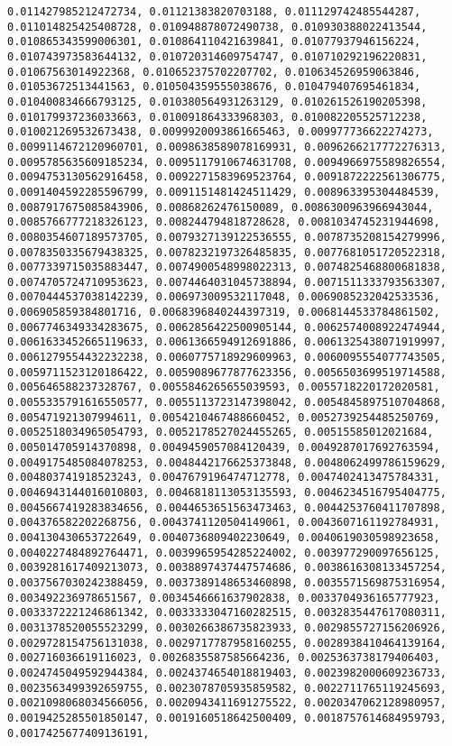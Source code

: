 \documentclass[11pt]{article}
\begin{document}
\begin{Verbatim}[commandchars=\\\{\}]
0.011427985212472734, 0.01121383820703188, 0.011129742485544287, 0.011014825425408728, 0.010948878072490738, 0.010930388022413544, 0.010865343599006301, 0.010864110421639841, 0.01077937946156224, 0.010743973583644132, 0.010720314609754747, 0.010710292196220831, 0.01067563014922368, 0.010652375702207702, 0.010634526959063846, 0.01053672513441563, 0.010504359555038676, 0.010479407695461834, 0.010400834666793125, 0.010380564931263129, 0.010261526190205398, 0.010179937236033663, 0.010091864333968303, 0.010082205525712238, 0.010021269532673438, 0.0099920093861665463, 0.009977736622274273, 0.0099114672120960701, 0.0098638589078169931, 0.0096266217772276313, 0.0095785635609185234, 0.0095117910674631708, 0.0094966975589826554, 0.0094753130562916458, 0.0092271583969523764, 0.0091872222561306775, 0.0091404592285596799, 0.0091151481424511429, 0.008963395304484539, 0.0087917675085843906, 0.00868262476150089, 0.0086300963966943044, 0.0085766777218326123, 0.008244794818728628, 0.0081034745231944698, 0.0080354607189573705, 0.0079327139122536555, 0.0078735208154279996, 0.0078350335679438325, 0.0078232197326485835, 0.0077681051720522318, 0.0077339715035883447, 0.0074900548998022313, 0.0074825468800681838, 0.0074705724710953623, 0.0074464031045738894, 0.0071511333793563307, 0.0070444537038142239, 0.006973009532117048, 0.0069085232042533536, 0.006905859384801716, 0.0068396840244397319, 0.0068144533784861502, 0.0067746349334283675, 0.0062856422500905144, 0.0062574008922474944, 0.0061633452665119633, 0.0061366594912691886, 0.0061325438071919997, 0.0061279554432232238, 0.0060775718929609963, 0.0060095554077743505, 0.0059711523120186422, 0.0059089677877623356, 0.0056503699519714588, 0.005646588237328767, 0.0055846265655039593, 0.0055718220172020581, 0.0055335791616550577, 0.0055113723147398042, 0.0054845897510704868, 0.005471921307994611, 0.0054210467488660452, 0.0052739254485250769, 0.0052518034965054793, 0.0052178527024455265, 0.00515585012021684, 0.005014705914370898, 0.0049459057084120439, 0.0049287017692763594, 0.0049175485084078253, 0.0048442176625373848, 0.0048062499786159629, 0.004803741918523243, 0.0047679196474712778, 0.0047402413475784331, 0.0046943144016010803, 0.0046818113053135593, 0.0046234516795404775, 0.0045667419283834656, 0.0044653651563473463, 0.0044253760411707898, 0.004376582202268756, 0.0043741120504149061, 0.0043607161192784931, 0.004130430653722649, 0.0040736809402230649, 0.0040619030598923658, 0.0040227484892764471, 0.0039965954285224002, 0.003977290097656125, 0.0039281617409213073, 0.0038897437447574686, 0.0038616308133457254, 0.0037567030242388459, 0.0037389148653460898, 0.0035571569875316954, 0.003492236978651567, 0.0034546661637902838, 0.0033704936165777923, 0.0033372221246861342, 0.0033333047160282515, 0.0032835447617080311, 0.0031378520055523299, 0.0030266386735823933, 0.0029855727156206926, 0.0029728154756131038, 0.0029717787958160255, 0.0028938410464139164, 0.002716036619116023, 0.0026835587585664236, 0.0025363738179406403, 0.0024745049592944384, 0.0024374654018819403, 0.0023982000609236733, 0.0023563499392659755, 0.0023078705935859582, 0.0022711765119245693, 0.0021098068034566056, 0.0020943411691275522, 0.0020347062128980957, 0.0019425285501850147, 0.0019160518642500409, 0.0018757614684959793, 0.0017425677409136191, 
\end{Verbatim}
\end{document}
